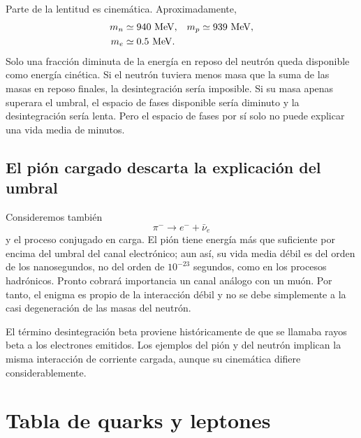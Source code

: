 Parte de la lentitud es cinemática. Aproximadamente,
\begin{equation}
\begin{aligned}
m_n&\simeq940\ {\rm MeV},
&
m_p&\simeq939\ {\rm MeV},
\\
m_e&\simeq0.5\ {\rm MeV}.
\end{aligned}
\end{equation}
Solo una fracción diminuta de la energía en reposo del neutrón queda disponible como energía cinética. Si el neutrón tuviera menos masa que la suma de las masas en reposo finales, la desintegración sería imposible. Si su masa apenas superara el umbral, el espacio de fases disponible sería diminuto y la desintegración sería lenta. Pero el espacio de fases por sí solo no puede explicar una vida media de minutos.

\subsection{El pión cargado descarta la explicación del umbral}

Consideremos también
\begin{equation}
\pi^-\longrightarrow e^-+\bar\nu_e
\end{equation}
y el proceso conjugado en carga. El pión tiene energía más que suficiente por encima del umbral del canal electrónico; aun así, su vida media débil es del orden de los nanosegundos, no del orden de \(10^{-23}\) segundos, como en los procesos hadrónicos. Pronto cobrará importancia un canal análogo con un muón. Por tanto, el enigma es propio de la interacción débil y no se debe simplemente a la casi degeneración de las masas del neutrón.


El término desintegración beta proviene históricamente de que se llamaba rayos beta a los electrones emitidos. Los ejemplos del pión y del neutrón implican la misma interacción de corriente cargada, aunque su cinemática difiere considerablemente.

\section{Tabla de quarks y leptones}

